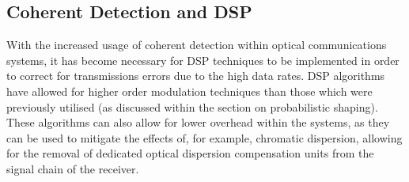 \subsection{Coherent Detection and DSP}

With the increased usage of coherent detection within optical communications
systems, it has become necessary for DSP techniques to be implemented in order
to correct for transmissions errors due to the high data rates. DSP algorithms
have allowed for higher order modulation techniques than those which were
previously utilised (as discussed within the section on probabilistic shaping).
These algorithms can also allow for lower overhead within the systems, as they
can be used to mitigate the effects of, for example, chromatic dispersion,
allowing for the removal of dedicated optical dispersion compensation units from
the signal chain of the receiver\cite{100Gbaud_2019}.
